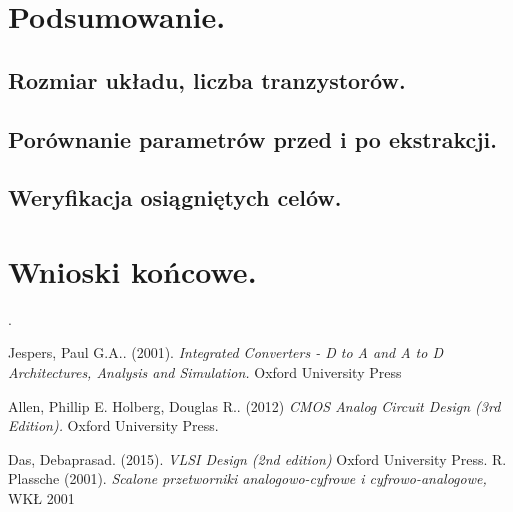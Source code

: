 \documentclass[10pt,a4paper]{report}
\begin{document}
	\chapter{Podsumowanie.}
	\section{Rozmiar układu, liczba tranzystorów.}
	\section{Porównanie parametrów przed i po ekstrakcji.}
	\section{Weryfikacja osiągniętych celów.}
	
	\chapter{Wnioski końcowe.}
	
	\appendix
.
	\begin{thebibliography}{9}
		Jespers, Paul G.A.. (2001). 
		\textit{Integrated Converters - D to A and A to D Architectures, Analysis and Simulation.}
		Oxford University Press
		
		Allen, Phillip E. Holberg, Douglas R.. (2012)  
		\textit{CMOS Analog Circuit Design (3rd Edition). }
		Oxford University Press.
		
		Das, Debaprasad. (2015).
		\textit{VLSI Design (2nd edition)}
		Oxford University Press.
		R. Plassche (2001). 
		\textit{Scalone przetworniki analogowo-cyfrowe i cyfrowo-analogowe,}
		WKŁ 2001
		
		
	\end{thebibliography}
\end{document}
